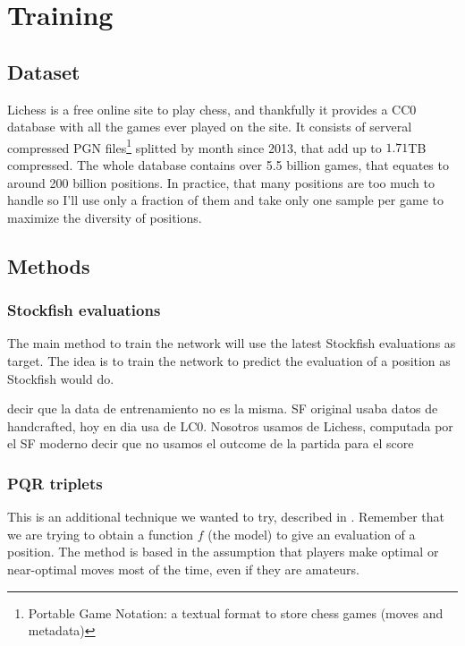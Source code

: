 \section{Training}



\subsection{Dataset}

Lichess is a free online site to play chess, and thankfully it provides a CC0 database \cite{lichessdb} with all the games ever played on the site. It consists of serveral compressed PGN files\footnote{Portable Game Notation: a textual format to store chess games (moves and metadata)} splitted by month since 2013, that add up to $1.71$TB compressed. The whole database contains over 5.5 billion games, that equates to around 200 billion positions. In practice, that many positions are too much to handle so I'll use only a fraction of them and take only one sample per game to maximize the diversity of positions.


\subsection{Methods}



\subsubsection{Stockfish evaluations}

The main method to train the network will use the latest Stockfish evaluations as target. The idea is to train the network to predict the evaluation of a position as Stockfish would do.


decir que la data de entrenamiento no es la misma. SF original usaba datos de handcrafted, hoy en dia usa de LC0. Nosotros usamos de Lichess, computada por el SF moderno
decir que no usamos el outcome de la partida para el score


\subsubsection{PQR triplets}

This is an additional technique we wanted to try, described in \cite{dlchess:2014}. Remember that we are trying to obtain a function $f$ (the model) to give an evaluation of a position. The method is based in the assumption that players make optimal or near-optimal moves most of the time, even if they are amateurs.

